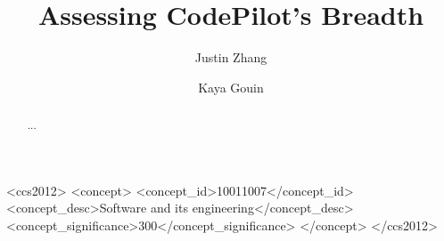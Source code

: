 \documentclass[sigconf]{acmart}
\begin{document}
\title{Assessing CodePilot's Breadth}

\author{Justin Zhang}
\author{Kaya Gouin}
\authornotemark[1]


\begin{abstract}
...
\end{abstract}

\begin{CCSXML}
<ccs2012>
   <concept>
       <concept_id>10011007</concept_id>
       <concept_desc>Software and its engineering</concept_desc>
       <concept_significance>300</concept_significance>
       </concept>
 </ccs2012>
\end{CCSXML}

\end{document}
